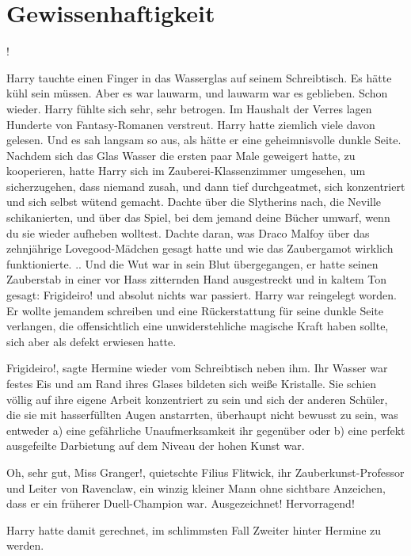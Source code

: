 \chapter{Gewissenhaftigkeit}

!\grqq{}

Harry tauchte einen Finger in das Wasserglas auf seinem Schreibtisch. Es hätte
kühl sein müssen. Aber es war lauwarm, und lauwarm war es geblieben. Schon
wieder. Harry fühlte sich sehr, sehr betrogen. Im Haushalt der Verres lagen
Hunderte von Fantasy-Romanen verstreut. Harry hatte ziemlich viele davon
gelesen. Und es sah langsam so aus, als hätte er eine geheimnisvolle dunkle
Seite. Nachdem sich das Glas Wasser die ersten paar Male geweigert hatte, zu
kooperieren, hatte Harry sich im Zauberei-Klassenzimmer umgesehen, um
sicherzugehen, dass niemand zusah, und dann tief durchgeatmet, sich konzentriert
und sich selbst wütend gemacht. Dachte über die Slytherins nach, die Neville
schikanierten, und über das Spiel, bei dem jemand deine Bücher umwarf, wenn du
sie wieder aufheben wolltest. Dachte daran, was Draco Malfoy über das
zehnjährige Lovegood-Mädchen gesagt hatte und wie das Zaubergamot wirklich
funktionierte. .. Und die Wut war in sein Blut übergegangen, er hatte seinen
Zauberstab in einer vor Hass zitternden Hand ausgestreckt und in kaltem Ton
gesagt: \glqq Frigideiro!\grqq{} und absolut nichts war passiert. Harry war
reingelegt worden. Er wollte jemandem schreiben und eine Rückerstattung für
seine dunkle Seite verlangen, die offensichtlich eine unwiderstehliche magische
Kraft haben sollte, sich aber als defekt erwiesen hatte.

\glqq Frigideiro!\grqq{}, sagte Hermine wieder vom Schreibtisch neben ihm. Ihr
Wasser war festes Eis und am Rand ihres Glases bildeten sich weiße Kristalle.
Sie schien völlig auf ihre eigene Arbeit konzentriert zu sein und sich der
anderen Schüler, die sie mit hasserfüllten Augen anstarrten, überhaupt nicht
bewusst zu sein, was entweder a) eine gefährliche Unaufmerksamkeit ihr gegenüber
oder b) eine perfekt ausgefeilte Darbietung auf dem Niveau der hohen Kunst war.

\glqq Oh, sehr gut, Miss Granger!\grqq{}, quietschte Filius Flitwick, ihr
Zauberkunst-Professor und Leiter von Ravenclaw, ein winzig kleiner Mann ohne
sichtbare Anzeichen, dass er ein früherer Duell-Champion war. \glqq
Ausgezeichnet! Hervorragend!\grqq{}

Harry hatte damit gerechnet, im schlimmsten Fall Zweiter hinter Hermine zu
werden.

